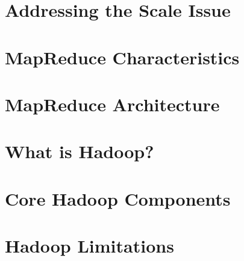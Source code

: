 \documentclass{book}
\begin{document}
    \paragraph{}
    
    \section{Addressing the Scale Issue}
    \paragraph{}
    
    \section{MapReduce Characteristics}
    \paragraph{}
    
    \section{MapReduce Architecture}
    \paragraph{}
    
    \section{What is Hadoop?}
    \paragraph{}
    
    \section{Core Hadoop Components}
    \paragraph{}
    
    \section{Hadoop Limitations}
    \paragraph{}

    \printbibliography
    \listoffigures
    
\end{document}
